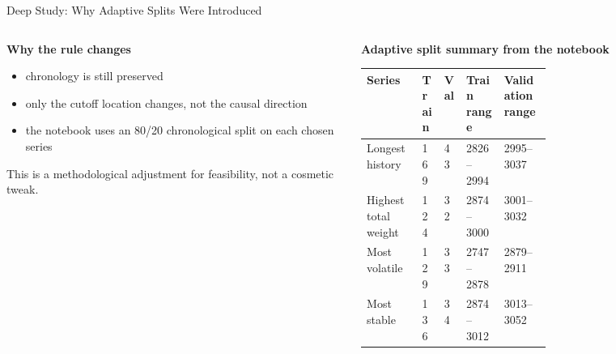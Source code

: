 \begin{frame}[t]{Deep Study: Why Adaptive Splits Were Introduced}
  \vspace{0.35em}

  \begin{columns}[T,onlytextwidth]
    \begin{panelbox}
      \textbf{Why the rule changes}
      \begin{itemize}
        \item chronology is still preserved
        \item only the cutoff location changes, not the causal direction
        \item the notebook uses an 80/20 chronological split on each chosen series
      \end{itemize}
      \divider
      This is a methodological adjustment for feasibility, not a cosmetic tweak.
    \end{panelbox}

    \begin{panelbox}
      \textbf{Adaptive split summary from the notebook}
      \small
      \begin{tabularx}{\linewidth}{L{0.30\linewidth}R{0.12\linewidth}R{0.12\linewidth}Y Y}
        \toprule
        \textbf{Series} & \textbf{Train} & \textbf{Val} & \textbf{Train range} & \textbf{Validation range} \\
        \midrule
        Longest history & 169 & 43 & 2826--2994 & 2995--3037 \\
        Highest total weight & 124 & 32 & 2874--3000 & 3001--3032 \\
        Most volatile & 129 & 33 & 2747--2878 & 2879--2911 \\
        Most stable & 136 & 34 & 2874--3012 & 3013--3052 \\
        \bottomrule
      \end{tabularx}
    \end{panelbox}
  \end{columns}
\end{frame}

